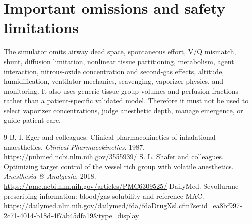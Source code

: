 \documentclass[11pt]{article}
\begin{document}
\section{Important omissions and safety limitations}
The simulator omits airway dead space, spontaneous effort, V/Q mismatch, shunt, diffusion limitation, nonlinear tissue partitioning, metabolism, agent interaction, nitrous-oxide concentration and second-gas effects, altitude, humidification, ventilator mechanics, scavenging, vaporizer physics, and monitoring. It also uses generic tissue-group volumes and perfusion fractions rather than a patient-specific validated model. Therefore it must not be used to select vaporizer concentrations, judge anesthetic depth, manage emergence, or guide patient care.

\begin{thebibliography}{9}
 B. I. Eger and colleagues. Clinical pharmacokinetics of inhalational anaesthetics. \emph{Clinical Pharmacokinetics}. 1987. \url{https://pubmed.ncbi.nlm.nih.gov/3555939/}
 S. L. Shafer and colleagues. Optimizing target control of the vessel rich group with volatile anesthetics. \emph{Anesthesia \& Analgesia}. 2018. \url{https://pmc.ncbi.nlm.nih.gov/articles/PMC6309525/}
 DailyMed. Sevoflurane prescribing information: blood/gas solubility and reference MAC. \url{https://dailymed.nlm.nih.gov/dailymed/fda/fdaDrugXsl.cfm?setid=ea8bf997-2c71-4014-b18d-4f7ab45dfa19&type=display}
\end{thebibliography}
\end{document}
